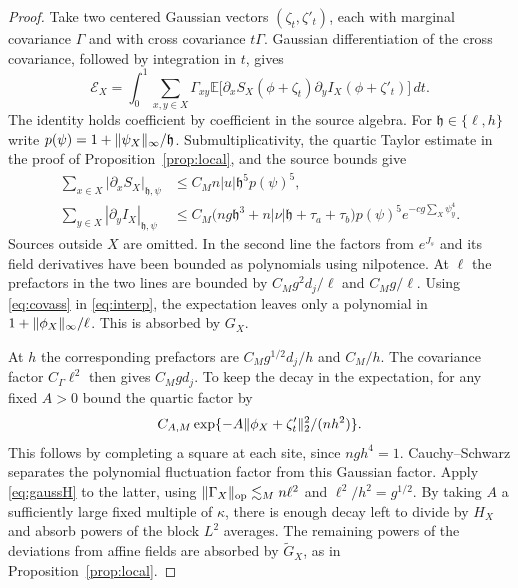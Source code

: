 \documentclass[11pt]{article}
\newcommand{\E}{\mathbb E}
\DeclarePairedDelimiter{\norm}{\lVert}{\rVert}
\begin{document}
\begin{proof}
Take two centered Gaussian vectors \((\zeta_t,\zeta'_t)\), each with marginal covariance \(\Gamma\) and with cross covariance \(t\Gamma\). Gaussian differentiation of the cross covariance, followed by integration in \(t\), gives
\begin{equation}\label{eq:interp}
 \mathcal E_X
 =\int_0^1\sum_{x,y\in X}\Gamma_{xy}
      \E\big[\partial_x S_X(\phi+\zeta_t)
                   \partial_y I_X(\phi+\zeta'_t)\big]\,dt .
\end{equation}
The identity holds coefficient by coefficient in the source algebra. For \(\mathfrak h\in\{\ell,h\}\) write \(p(\psi)=1+\norm{\psi_X}_\infty/\mathfrak h\). Submultiplicativity, the quartic Taylor estimate in the proof of Proposition~\ref{prop:local}, and the source bounds give
\begin{align*}
 \sum_{x\in X}|\partial_xS_X|_{\mathfrak h,\psi}
 &\le C_M n|u|\mathfrak h^5 p(\psi)^5,\\
 \sum_{y\in X}|\partial_y I_X|_{\mathfrak h,\psi}
 &\le C_M\big(n g\mathfrak h^3+n|\nu|\mathfrak h+\tau_a+\tau_b\big)
            p(\psi)^5 e^{-c g\sum_X\psi_y^4}.
\end{align*}
Sources outside \(X\) are omitted. In the second line the factors from \(e^{J_s}\) and its field derivatives have been bounded as polynomials using nilpotence. At \(\ell\) the prefactors in the two lines are bounded by \(C_Mg^2d_j/\ell\) and \(C_Mg/\ell\). Using \eqref{eq:covass} in \eqref{eq:interp}, the expectation leaves only a polynomial in \(1+\norm{\phi_X}_\infty/\ell\). This is absorbed by \(G_X\).

At \(h\) the corresponding prefactors are \(C_Mg^{1/2}d_j/h\) and \(C_M/h\). The covariance factor \(C_\Gamma\ell^2\) then gives \(C_Mgd_j\). To keep the decay in the expectation, for any fixed \(A>0\) bound the quartic factor by
\[
 C_{A,M}\exp\{-A\norm{\phi_X+\zeta'_t}_2^2/(nh^2)\}.
\]
This follows by completing a square at each site, since \(ngh^4=1\). Cauchy--Schwarz separates the polynomial fluctuation factor from this Gaussian factor. Apply \eqref{eq:gaussH} to the latter, using
\(\norm{\Gamma_X}_{\mathrm{op}}\lesssim_M n\ell^2\) and
\(\ell^2/h^2=g^{1/2}\). By taking \(A\) a sufficiently large fixed multiple of \(\kappa\), there is enough decay left to divide by \(H_X\) and absorb powers of the block \(L^2\) averages. The remaining powers of the deviations from affine fields are absorbed by \(\widetilde G_X\), as in Proposition~\ref{prop:local}.
\end{proof}
\end{document}
